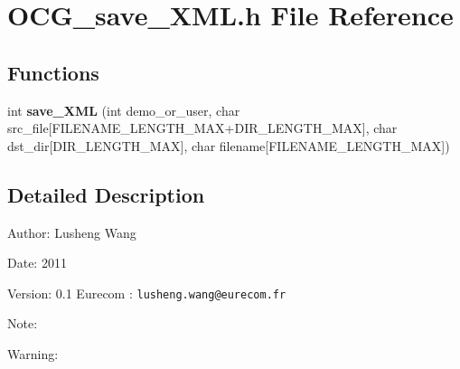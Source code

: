 \section{OCG\_\-save\_\-XML.h File Reference}
\label{OCG__save__XML_8h}
\subsection*{Functions}
\begin{CompactItemize}
\item 
int {\bf save\_\-XML} (int demo\_\-or\_\-user, char src\_\-file[FILENAME\_\-LENGTH\_\-MAX+DIR\_\-LENGTH\_\-MAX], char dst\_\-dir[DIR\_\-LENGTH\_\-MAX], char filename[FILENAME\_\-LENGTH\_\-MAX])
\end{CompactItemize}


\subsection{Detailed Description}
\begin{Desc}
\item[Author:]Lusheng Wang \end{Desc}
\begin{Desc}
\item[Date:]2011 \end{Desc}
\begin{Desc}
\item[Version:]0.1  Eurecom : {\tt lusheng.wang@eurecom.fr} \end{Desc}
\begin{Desc}
\item[Note:]\end{Desc}
\begin{Desc}
\item[Warning:]\end{Desc}
